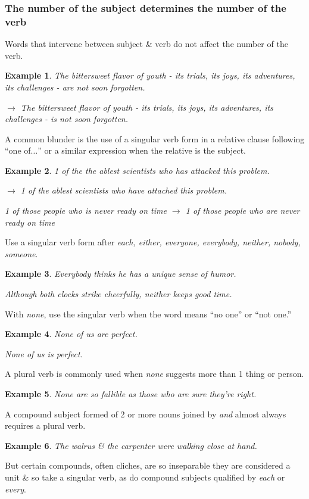 \documentclass{article}
\newtheorem{example}{Example}
\begin{document}
\subsubsection{The number of the subject determines the number of the verb}
Words that intervene between subject \& verb do not affect the number of the verb.
\begin{example}
	The bittersweet flavor of youth - its trials, its joys, its adventures, its challenges - are not soon forgotten.
	
	$\to$ The bittersweet flavor of youth - its trials, its joys, its adventures, its challenges - is not soon forgotten.
\end{example}
A common blunder is the use of a singular verb form in a relative clause following ``one of$\ldots$'' or a similar expression when the relative is the subject.
\begin{example}
	1 of the the ablest scientists who has attacked this problem.
	
	$\to$ 1 of the ablest scientists who have attached this problem.
	
	1 of those people who is never ready on time $\to$ 1 of those people who are never ready on time
\end{example}
Use a singular verb form after {\it each, either, everyone, everybody, neither, nobody, someone}.
\begin{example}
	Everybody thinks he has a unique sense of humor.
	
	Although both clocks strike cheerfully, neither keeps good time.
\end{example}
With {\it none}, use the singular verb when the word means ``no one'' or ``not one.''
\begin{example}
	None of us are perfect.
	
	None of us is perfect.
\end{example}
A plural verb is commonly used when {\it none} suggests more than 1 thing or person.
\begin{example}
	None are so fallible as those who are sure they're right.
\end{example}
A compound subject formed of 2 or more nouns joined by {\it and} almost always requires a plural verb.
\begin{example}
	The walrus \& the carpenter were walking close at hand.
\end{example}
But certain compounds, often cliches, are so inseparable they are considered a unit \& so take a singular verb, as do compound subjects qualified by {\it each} or {\it every}.
\end{document}
